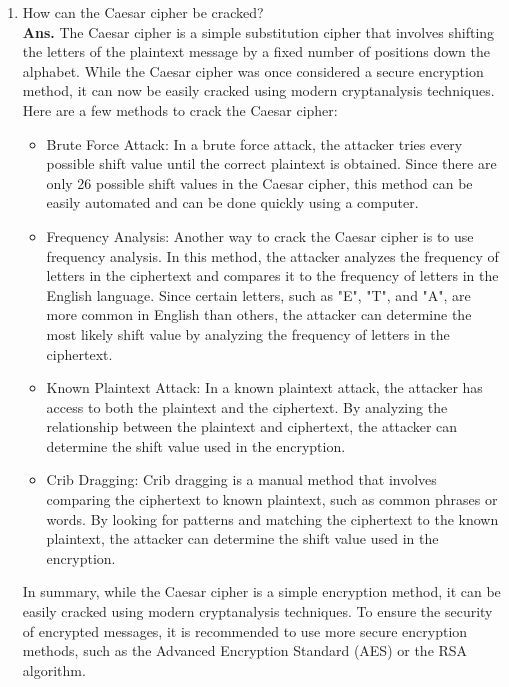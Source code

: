 \documentclass{article}
\begin{document}
\begin{enumerate}
	\item How can the Caesar cipher be cracked?\\
	
	\textbf{Ans.}  The Caesar cipher is a simple substitution cipher that involves shifting the letters of the plaintext message by a fixed number of positions down the alphabet. While the Caesar cipher was once considered a secure encryption method, it can now be easily cracked using modern cryptanalysis techniques. Here are a few methods to crack the Caesar cipher:
	\begin{itemize}
		\item Brute Force Attack: In a brute force attack, the attacker tries every possible shift value until the correct plaintext is obtained. Since there are only 26 possible shift values in the Caesar cipher, this method can be easily automated and can be done quickly using a computer.
		\item Frequency Analysis: Another way to crack the Caesar cipher is to use frequency analysis. In this method, the attacker analyzes the frequency of letters in the ciphertext and compares it to the frequency of letters in the English language. Since certain letters, such as "E", "T", and "A", are more common in English than others, the attacker can determine the most likely shift value by analyzing the frequency of letters in the ciphertext.
		\item Known Plaintext Attack: In a known plaintext attack, the attacker has access to both the plaintext and the ciphertext. By analyzing the relationship between the plaintext and ciphertext, the attacker can determine the shift value used in the encryption.
		\item Crib Dragging: Crib dragging is a manual method that involves comparing the ciphertext to known plaintext, such as common phrases or words. By looking for patterns and matching the ciphertext to the known plaintext, the attacker can determine the shift value used in the encryption.
	\end{itemize}
	In summary, while the Caesar cipher is a simple encryption method, it can be easily cracked using modern cryptanalysis techniques. To ensure the security of encrypted messages, it is recommended to use more secure encryption methods, such as the Advanced Encryption Standard (AES) or the RSA algorithm.
\end{enumerate}
\end{document}
